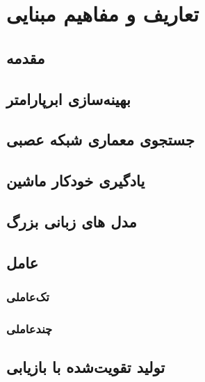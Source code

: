 \chapter{تعاریف و مفاهیم مبنایی }
\thispagestyle{empty}
\section{مقدمه}

\section{بهینه‌سازی ابرپارامتر}
\section{جستجوی معماری شبکه عصبی}
\section{یادگیری خودکار ماشین}
\section{مدل های زبانی بزرگ}
\section{عامل}
\subsection{تک‌عاملی}
\subsection{چندعاملی}
\section{تولید تقویت‌شده با بازیابی}


